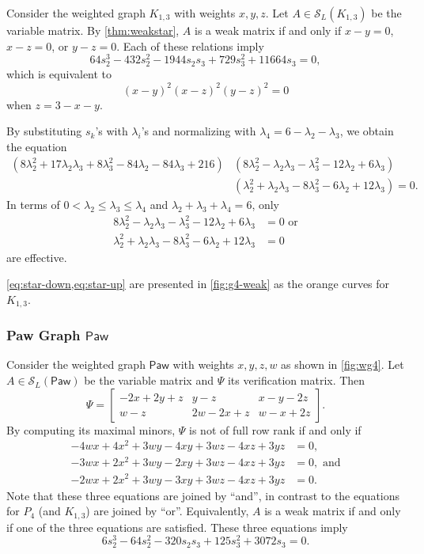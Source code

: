 \documentclass{article}
\theoremstyle{definition}
\newcommand{\mptn}{\mathcal{S}}
\newcommand{\Paw}{\mathsf{Paw}}
\begin{document}
Consider the weighted graph $K_{1,3}$ with weights $x,y,z$.  Let $A\in\mptn_L(K_{1,3})$ be the variable matrix.  By \cref{thm:weakstar}, $A$ is a weak matrix if and only if $x - y = 0$, $x - z = 0$, or $y - z = 0$.  Each of these relations imply
\[
    64 s_{2}^{3} - 432 s_{2}^{2} - 1944 s_{2} s_{3} + 729 s_{3}^{2} + 11664 s_{3} = 0,
\]
which is equivalent to
\[
    (x - y)^2 (x - z)^2 (y - z)^2 = 0
\]
when $z = 3 - x - y$.  

By substituting $s_k$'s with $\lambda_i$'s and normalizing with $\lambda_4 = 6 - \lambda_2 - \lambda_3$, we obtain the equation 
\begin{align*}
(8\lambda_2^2 + 17\lambda_2\lambda_3 + 8\lambda_3^2 - 84\lambda_2 - 84\lambda_3 + 216)&(8\lambda_2^2 - \lambda_2\lambda_3 - \lambda_3^2 - 12\lambda_2 + 6\lambda_3)\\
&(\lambda_2^2 + \lambda_2\lambda_3 - 8\lambda_3^2 - 6\lambda_2 + 12\lambda_3) = 0.
\end{align*}
In terms of $0 < \lambda_2 \leq \lambda_3 \leq \lambda_4$ and $\lambda_2 + \lambda_3 + \lambda_4 = 6$, only
\begin{align}
    8\lambda_2^2 - \lambda_2\lambda_3 - \lambda_3^2 - 12\lambda_2 + 6\lambda_3 &= 0 \text{ or} \label{eq:star-down} \\
    \lambda_2^2 + \lambda_2\lambda_3 - 8\lambda_3^2 - 6\lambda_2 + 12\lambda_3 &= 0 \label{eq:star-up}
\end{align}
are effective.

\cref{eq:star-down,eq:star-up} are presented in \cref{fig:g4-weak} as the orange curves for $K_{1,3}$.

\subsubsection{Paw Graph \texorpdfstring{$\Paw$}{Paw}}

Consider the weighted graph $\Paw$ with weights $x,y,z,w$ as shown in \cref{fig:wg4}.  Let $A\in\mptn_L(\Paw)$ be the variable matrix and $\Psi$ its verification matrix.  Then
\[
    \Psi = \begin{bmatrix}
        -2x + 2y + z & y - z & x - y - 2z \\
        w - z & 2w - 2x + z & w - x + 2z
    \end{bmatrix}.
\]
By computing its maximal minors, $\Psi$ is not of full row rank if and only if
\[
    \begin{aligned}
        -4w x + 4x^{2} + 3w y - 4x y + 3w z - 4x z + 3y z &= 0, \\
        -3w x + 2x^{2} + 3w y - 2x y + 3w z - 4x z + 3y z &= 0, \text{ and}\\
-2w x + 2x^{2} + 3w y - 3x y + 3w z - 4x z + 3y z &= 0.
    \end{aligned}
\]
Note that these three equations are joined by ``and'', in contrast to the equations for $P_4$ (and $K_{1,3}$) are joined by ``or''.  Equivalently, $A$ is a weak matrix if and only if one of the three equations are satisfied.  These three equations imply 
\[
    6 s_{2}^{3} - 64 s_{2}^{2} - 320 s_{2} s_{3} + 125 s_{3}^{2} + 3072 s_{3} = 0.
\]
\end{document}
